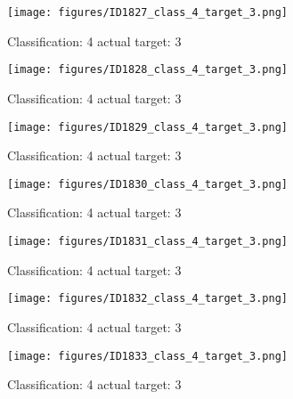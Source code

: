 \begin{figure}[h!]
\begin{center}
\texttt{[image: figures/ID1827\_class\_4\_target\_3.png]}
\end{center}
\caption{ Classification: 4 actual target: 3}
\label{fig:ID1827_class_4_target_3}
\end{figure}
\begin{figure}[h!]
\begin{center}
\texttt{[image: figures/ID1828\_class\_4\_target\_3.png]}
\end{center}
\caption{ Classification: 4 actual target: 3}
\label{fig:ID1828_class_4_target_3}
\end{figure}
\begin{figure}[h!]
\begin{center}
\texttt{[image: figures/ID1829\_class\_4\_target\_3.png]}
\end{center}
\caption{ Classification: 4 actual target: 3}
\label{fig:ID1829_class_4_target_3}
\end{figure}
\begin{figure}[h!]
\begin{center}
\texttt{[image: figures/ID1830\_class\_4\_target\_3.png]}
\end{center}
\caption{ Classification: 4 actual target: 3}
\label{fig:ID1830_class_4_target_3}
\end{figure}
\begin{figure}[h!]
\begin{center}
\texttt{[image: figures/ID1831\_class\_4\_target\_3.png]}
\end{center}
\caption{ Classification: 4 actual target: 3}
\label{fig:ID1831_class_4_target_3}
\end{figure}
\begin{figure}[h!]
\begin{center}
\texttt{[image: figures/ID1832\_class\_4\_target\_3.png]}
\end{center}
\caption{ Classification: 4 actual target: 3}
\label{fig:ID1832_class_4_target_3}
\end{figure}
\begin{figure}[h!]
\begin{center}
\texttt{[image: figures/ID1833\_class\_4\_target\_3.png]}
\end{center}
\caption{ Classification: 4 actual target: 3}
\label{fig:ID1833_class_4_target_3}
\end{figure}
